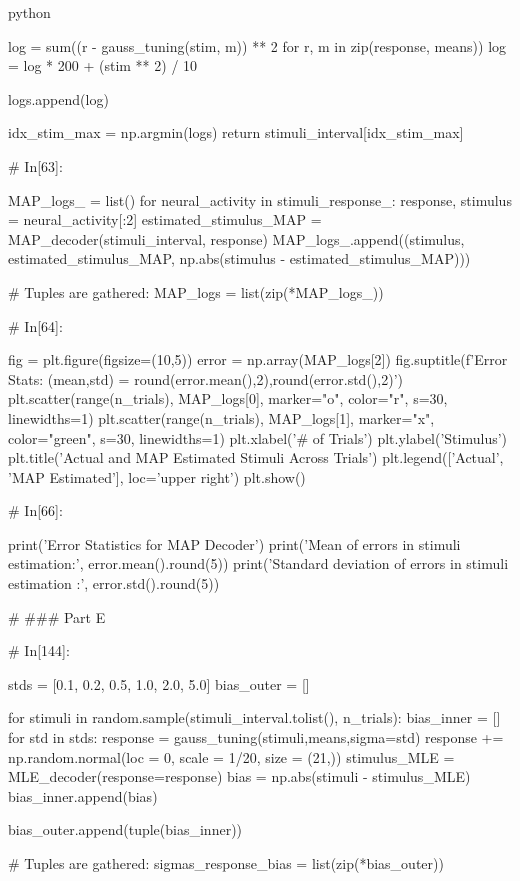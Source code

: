 \documentclass[12pt]{amsart}
\begin{document}
\begin{mintedbox}{python}
       
        log = sum((r - gauss_tuning(stim, m)) ** 2 for r, m in zip(response, means))
        log = log * 200 + (stim ** 2) / 10 
        
        logs.append(log)

    idx_stim_max = np.argmin(logs)
    return stimuli_interval[idx_stim_max]
        


# In[63]:


MAP_logs_ = list()
for neural_activity in stimuli_response_:
    response, stimulus = neural_activity[:2]
    estimated_stimulus_MAP = MAP_decoder(stimuli_interval, response)
    MAP_logs_.append((stimulus, estimated_stimulus_MAP, np.abs(stimulus - estimated_stimulus_MAP)))
    
            
# Tuples are gathered:
MAP_logs = list(zip(*MAP_logs_))


# In[64]:


fig = plt.figure(figsize=(10,5))
error = np.array(MAP_logs[2])
fig.suptitle(f'Error Stats: (mean,std) = {round(error.mean(),2),round(error.std(),2)}')
plt.scatter(range(n_trials), MAP_logs[0], marker="o", color="r", s=30, linewidths=1)
plt.scatter(range(n_trials), MAP_logs[1], marker="x", color="green", s=30, linewidths=1)
plt.xlabel('# of Trials')
plt.ylabel('Stimulus')
plt.title('Actual and MAP Estimated Stimuli Across Trials')
plt.legend(['Actual', 'MAP Estimated'], loc='upper right')
plt.show()


# In[66]:


print('Error Statistics for MAP Decoder')
print('Mean of errors in stimuli estimation:', error.mean().round(5))
print('Standard deviation of errors in stimuli estimation :', error.std().round(5))


# ### Part E

# In[144]:


stds = [0.1, 0.2, 0.5, 1.0, 2.0, 5.0]
bias_outer = []

for stimuli in random.sample(stimuli_interval.tolist(), n_trials):
    bias_inner = []
    for std in stds:
        response = gauss_tuning(stimuli,means,sigma=std)
        response += np.random.normal(loc = 0, scale = 1/20, size = (21,)) 
        stimulus_MLE = MLE_decoder(response=response)
        bias = np.abs(stimuli - stimulus_MLE)
        bias_inner.append(bias)

    bias_outer.append(tuple(bias_inner))

 # Tuples are gathered:
sigmas_response_bias = list(zip(*bias_outer))   



\end{mintedbox}
\end{document}
